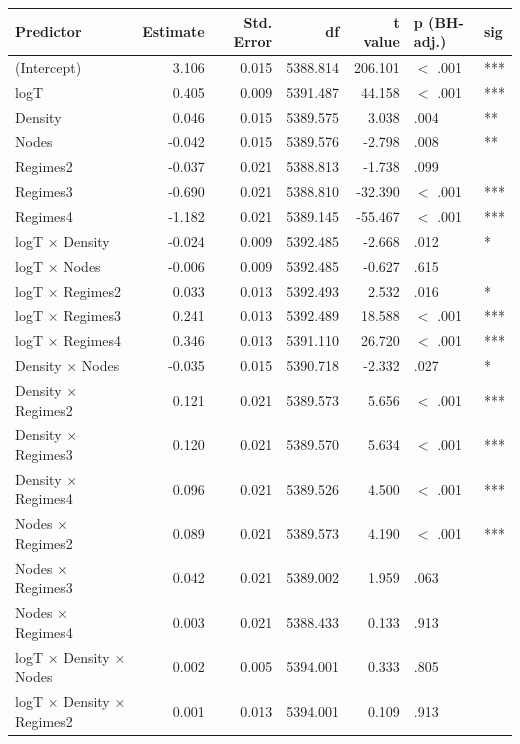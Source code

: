 \begin{table}[ht]
\centering
\begin{tabular}{lrrrrll}
  \hline
Predictor & Estimate & Std. Error & df & t value & p (BH-adj.) & sig \\ 
  \hline
(Intercept) & 3.106 & 0.015 & 5388.814 & 206.101 & $<$ .001 & *** \\ 
  logT & 0.405 & 0.009 & 5391.487 & 44.158 & $<$ .001 & *** \\ 
  Density & 0.046 & 0.015 & 5389.575 & 3.038 & .004 & ** \\ 
  Nodes & -0.042 & 0.015 & 5389.576 & -2.798 & .008 & ** \\ 
  Regimes2 & -0.037 & 0.021 & 5388.813 & -1.738 & .099 &  \\ 
  Regimes3 & -0.690 & 0.021 & 5388.810 & -32.390 & $<$ .001 & *** \\ 
  Regimes4 & -1.182 & 0.021 & 5389.145 & -55.467 & $<$ .001 & *** \\ 
  logT × Density & -0.024 & 0.009 & 5392.485 & -2.668 & .012 & * \\ 
  logT × Nodes & -0.006 & 0.009 & 5392.485 & -0.627 & .615 &  \\ 
  logT × Regimes2 & 0.033 & 0.013 & 5392.493 & 2.532 & .016 & * \\ 
  logT × Regimes3 & 0.241 & 0.013 & 5392.489 & 18.588 & $<$ .001 & *** \\ 
  logT × Regimes4 & 0.346 & 0.013 & 5391.110 & 26.720 & $<$ .001 & *** \\ 
  Density × Nodes & -0.035 & 0.015 & 5390.718 & -2.332 & .027 & * \\ 
  Density × Regimes2 & 0.121 & 0.021 & 5389.573 & 5.656 & $<$ .001 & *** \\ 
  Density × Regimes3 & 0.120 & 0.021 & 5389.570 & 5.634 & $<$ .001 & *** \\ 
  Density × Regimes4 & 0.096 & 0.021 & 5389.526 & 4.500 & $<$ .001 & *** \\ 
  Nodes × Regimes2 & 0.089 & 0.021 & 5389.573 & 4.190 & $<$ .001 & *** \\ 
  Nodes × Regimes3 & 0.042 & 0.021 & 5389.002 & 1.959 & .063 &  \\ 
  Nodes × Regimes4 & 0.003 & 0.021 & 5388.433 & 0.133 & .913 &  \\ 
  logT × Density × Nodes & 0.002 & 0.005 & 5394.001 & 0.333 & .805 &  \\ 
  logT × Density × Regimes2 & 0.001 & 0.013 & 5394.001 & 0.109 & .913 &  \\ 

\end{tabular}
\end{table}
